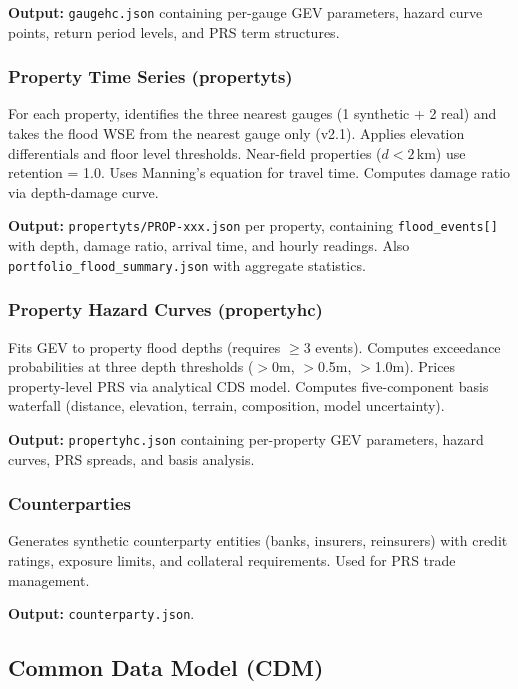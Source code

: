 \documentclass[11pt,a4paper]{article}
\begin{document}
\textbf{Output:} \texttt{gaugehc.json} containing per-gauge GEV parameters,
hazard curve points, return period levels, and PRS term structures.

\subsubsection{Property Time Series (propertyts)}

For each property, identifies the three nearest gauges (1 synthetic + 2 real)
and takes the flood WSE from the nearest gauge only (v2.1). Applies elevation
differentials and floor level thresholds. Near-field properties ($d < 2$\,km)
use retention = 1.0. Uses Manning's equation for travel time. Computes damage
ratio via depth-damage curve.

\textbf{Output:} \texttt{propertyts/PROP-xxx.json} per property, containing
\texttt{flood\_events[]} with depth, damage ratio, arrival time, and hourly
readings. Also \texttt{portfolio\_flood\_summary.json} with aggregate
statistics.

\subsubsection{Property Hazard Curves (propertyhc)}

Fits GEV to property flood depths (requires $\geq 3$ events). Computes
exceedance probabilities at three depth thresholds ($>$0m, $>$0.5m, $>$1.0m).
Prices property-level PRS via analytical CDS model. Computes five-component
basis waterfall (distance, elevation, terrain, composition, model uncertainty).

\textbf{Output:} \texttt{propertyhc.json} containing per-property GEV
parameters, hazard curves, PRS spreads, and basis analysis.

\subsubsection{Counterparties}

Generates synthetic counterparty entities (banks, insurers, reinsurers) with
credit ratings, exposure limits, and collateral requirements. Used for PRS
trade management.

\textbf{Output:} \texttt{counterparty.json}.

\subsection{Common Data Model (CDM)}
\end{document}
